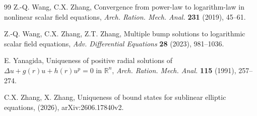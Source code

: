 \documentclass[11pt]{article}
\begin{document}
\begin{thebibliography}{99}
 Z.-Q. Wang, C.X. Zhang,
Convergence from power-law to logarithm-law in nonlinear scalar field equations,
\emph{Arch. Ration. Mech. Anal.} \textbf{231} (2019), 45--61.

 Z.-Q. Wang, C.X. Zhang, Z.T. Zhang,
Multiple bump solutions to logarithmic scalar field equations,
\emph{Adv. Differential Equations} \textbf{28} (2023), 981--1036.

E. Yanagida,
{Uniqueness of positive radial solutions of $\Delta u+g(r)u+h(r)u^p=0$ in $\mathbb R^n$,}
\emph{Arch. Ration. Mech. Anal.} \textbf{115} (1991), 257--274.


 {C.X. Zhang}, X. Zhang,
Uniqueness of bound states for sublinear elliptic equations, (2026),
{arXiv:2606.17840v2}.

\end{thebibliography}
\end{document}
